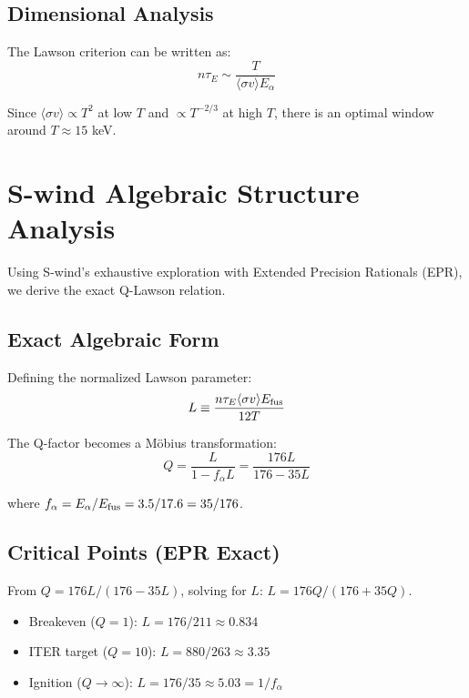\documentclass[11pt,a4paper]{article}
\begin{document}
\subsection{Dimensional Analysis}

The Lawson criterion can be written as:
\begin{equation}
n\tau_E \sim \frac{T}{\langle\sigma v\rangle E_\alpha}
\end{equation}

Since $\langle\sigma v\rangle \propto T^2$ at low $T$ and $\propto T^{-2/3}$ at high $T$, 
there is an optimal window around $T \approx 15$ keV.

\section{S-wind Algebraic Structure Analysis}

Using S-wind's exhaustive exploration with Extended Precision Rationals (EPR),
we derive the exact Q-Lawson relation.

\subsection{Exact Algebraic Form}

Defining the normalized Lawson parameter:
\begin{equation}
L \equiv \frac{n\tau_E \langle\sigma v\rangle E_{\rm fus}}{12T}
\end{equation}

The Q-factor becomes a M\"{o}bius transformation:
\begin{equation}
\boxed{Q = \frac{L}{1 - f_\alpha L} = \frac{176L}{176 - 35L}}
\end{equation}

where $f_\alpha = E_\alpha/E_{\rm fus} = 3.5/17.6 = 35/176$.

\subsection{Critical Points (EPR Exact)}

From $Q = 176L/(176-35L)$, solving for $L$: $L = 176Q/(176+35Q)$.

\begin{itemize}
\item Breakeven ($Q=1$): $L = 176/211 \approx 0.834$
\item ITER target ($Q=10$): $L = 880/263 \approx 3.35$
\item Ignition ($Q \to \infty$): $L = 176/35 \approx 5.03 = 1/f_\alpha$
\end{itemize}
\end{document}
